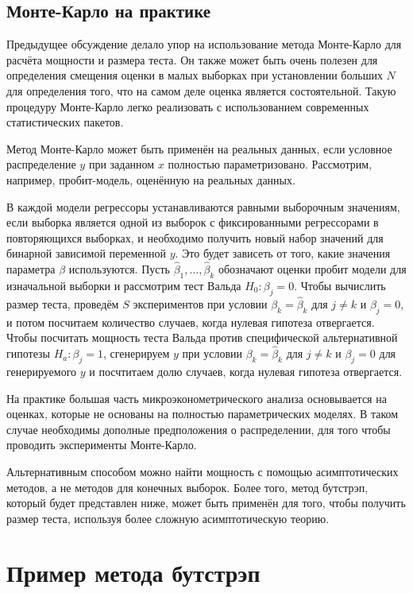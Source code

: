 \subsection{Монте-Карло на практике}

Предыдущее обсуждение делало упор на использование метода Монте-Карло для расчёта мощности и размера теста. Он также может быть очень полезен для определения смещения оценки в малых выборках при установлении больших $N$ для определения того, что на самом деле оценка является состоятельной. Такую процедуру Монте-Карло легко реализовать с использованием современных статистических пакетов.

Метод Монте-Карло может быть применён на реальных данных, если условное распределение $y$ при заданном $x$ полностью параметризовано. Рассмотрим, например, пробит-модель, оценённую на реальных данных. 

В каждой модели регрессоры устанавливаются равными выборочным значениям, если выборка является одной из выборок с фиксированными регрессорами в повторяющихся выборках, и необходимо получить новый набор значений для бинарной зависимой переменной $y$. Это будет зависеть от того, какие значения параметра $\beta$ используются. Пусть $\hat{\beta}_1, \dots, \hat{\beta}_k$ обозначают оценки пробит модели для изначальной выборки и рассмотрим тест Вальда $H_0: \beta_j = 0$. Чтобы вычислить размер теста, проведём $S$ экспериментов при условии $\beta_k = \hat{\beta}_k$ для $j \not= k$ и $\beta_j = 0$, и потом посчитаем количество случаев, когда нулевая гипотеза отвергается. Чтобы посчитать мощность теста Вальда против специфической альтернативной гипотезы $H_a: \beta_j = 1$, сгенерируем $y$ при условии $\beta_k = \hat{\beta}_k$ для $j \not= k$ и $\beta_j = 0$ для генерируемого $y$ и посчтитаем долю случаев, когда нулевая гипотеза отвергается.

На практике большая часть микроэконометрического анализа основывается на оценках, которые не основаны на полностью параметрических моделях. В таком случае необходимы дополные предположения о распределении, для того чтобы проводить эксперименты Монте-Карло. 

Альтернативным способом можно найти мощность с помощью асимптотических методов, а не методов для конечных выборок. Более того, метод бутстрэп, который будет представлен ниже, может быть применён для того, чтобы получить размер теста, используя более сложную асимптотическую теорию. 

\section{Пример метода бутстрэп}

